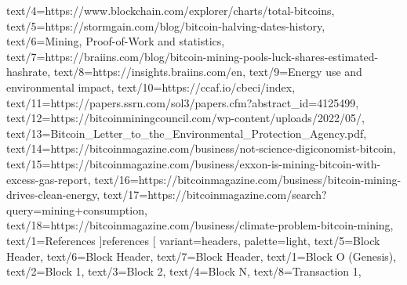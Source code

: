 \documentclass[aspectratio=169]{beamer}
\begin{document}
  text/4={https://www.blockchain.com/explorer/charts/total-bitcoins},
  text/5={https://stormgain.com/blog/bitcoin-halving-dates-history},
  text/6={Mining, Proof-of-Work and statistics},
  text/7={https://braiins.com/blog/bitcoin-mining-pools-luck-shares-estimated-hashrate},
  text/8={https://insights.braiins.com/en},
  text/9={Energy use and environmental impact},
  text/10={https://ccaf.io/cbeci/index},
  text/11={https://papers.ssrn.com/sol3/papers.cfm?abstract\_id=4125499},
  text/12={https://bitcoinminingcouncil.com/wp-content/uploads/2022/05/},
  text/13={Bitcoin\_Letter\_to\_the\_Environmental\_Protection\_Agency.pdf},
  text/14={https://bitcoinmagazine.com/business/not-science-digiconomist-bitcoin},
  text/15={https://bitcoinmagazine.com/business/exxon-is-mining-bitcoin-with-excess-gas-report},
  text/16={https://bitcoinmagazine.com/business/bitcoin-mining-drives-clean-energy},
  text/17={https://bitcoinmagazine.com/search?query=mining+consumption},
  text/18={https://bitcoinmagazine.com/business/climate-problem-bitcoin-mining},
  text/1={References}
]{references}
\gdef\studiocataloguename{\detokenize{hash-avalanche}}
\gdef\studiocataloguename{\detokenize{key-derivation}}
\gdef\studiocataloguename{\detokenize{signature-flow}}
\gdef\studiocataloguename{\detokenize{protocol-sequence}}
\gdef\studiocataloguename{\detokenize{block-chain}}
\studiotemplate[
  variant={headers},
  palette={light},
  text/5={Block Header},
  text/6={Block Header},
  text/7={Block Header},
  text/1={Block O (Genesis)},
  text/2={Block 1},
  text/3={Block 2},
  text/4={Block N},
  text/8={Transaction 1},
\end{document}
